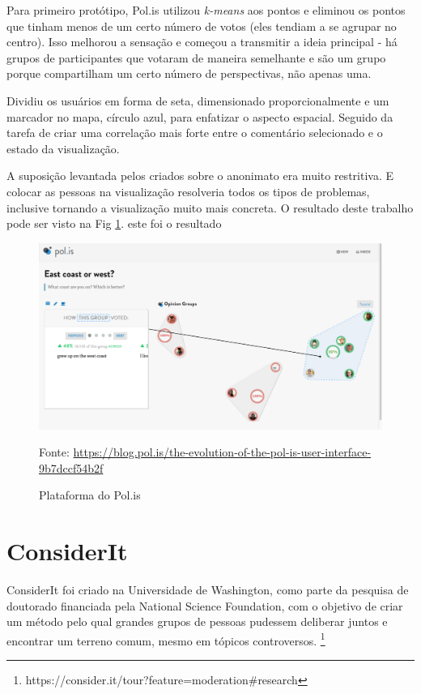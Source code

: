Para primeiro protótipo, Pol.is utilizou \textit{k-means} aos pontos e eliminou os pontos que tinham menos de um certo número de votos (eles tendiam a se agrupar no centro). Isso melhorou a sensação e começou a transmitir a ideia principal - há grupos de participantes que votaram de maneira semelhante e são um grupo porque compartilham um certo número de perspectivas, não apenas uma.

Dividiu os usuários em forma de seta, dimensionado proporcionalmente e um marcador no mapa, círculo azul, para enfatizar o aspecto espacial. Seguido da tarefa de criar uma correlação mais forte entre o comentário selecionado e o estado da visualização.

A suposição levantada pelos criados sobre o anonimato era muito restritiva. E colocar as pessoas na visualização resolveria todos os tipos de problemas, inclusive tornando a visualização muito mais concreta. O resultado deste trabalho pode ser visto na Fig \ref{fig03}. este foi o resultado 


\begin{figure}[h]
	\centering
	\includegraphics[keepaspectratio=true,scale=0.3]{figuras/evolucao-polis-3.png}
	\caption{Plataforma do Pol.is}
	Fonte: \url{https://blog.pol.is/the-evolution-of-the-pol-is-user-interface-9b7dccf54b2f}
	\label{fig03}
\end{figure}



\section{ConsiderIt}

ConsiderIt foi criado na Universidade de Washington, como parte da pesquisa de doutorado financiada pela National Science Foundation, com o objetivo de criar um método pelo qual grandes grupos de pessoas pudessem deliberar juntos e encontrar um terreno comum, mesmo em tópicos controversos.
\footnote{https://consider.it/tour?feature=moderation\#research}


